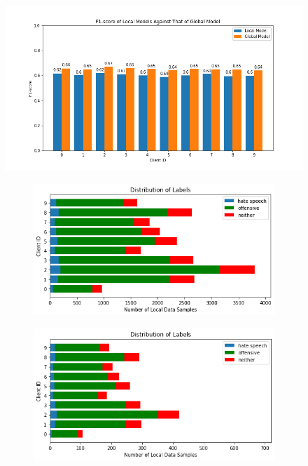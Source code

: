 \documentclass[letterpaper]{article} %
\begin{document}
\begin{figure}[hbt!]
{\includegraphics[width=\columnwidth]{iid_seed_7performance_of_models_on_client_data_f1score}}
\caption{}
\end{figure}


\begin{figure}[hbt!]

\begin{subfigure}{\columnwidth}
{\includegraphics[width=\columnwidth]{iid-quantity-skew_distribution_of_labels_5}}
\caption{}
\end{subfigure}

\begin{subfigure}{\columnwidth}
{\includegraphics[width=\columnwidth]{iid-quantity-skew_test_set_distribution_of_labels_5}}
\caption{}
\end{subfigure}

\caption{}
\end{figure}
\end{document}

